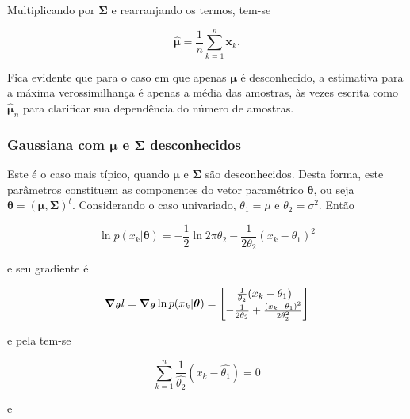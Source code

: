 \noindent Multiplicando por $\boldsymbol{\Sigma}$ e rearranjando os termos, tem-se

\begin{equation}
    \boldsymbol{\hat{\mu}} = \frac{1}{n} \sum_{k=1}^{n} \boldsymbol{x}_k.
    \label{eq:mu_optimum_case_1}
\end{equation}

Fica evidente que para o caso em que apenas $\boldsymbol{\mu}$ é desconhecido, a estimativa para a máxima verossimilhança é apenas a média das amostras, às vezes escrita como $\boldsymbol{\hat{\mu}}_n$ para clarificar sua dependência do número de amostras.

\subsubsection*{Gaussiana com $\boldsymbol{\mu}$ e $\boldsymbol{\Sigma}$ desconhecidos}

Este é o caso mais típico, quando $\boldsymbol{\mu}$ e $\boldsymbol{\Sigma}$ são desconhecidos. Desta forma, este parâmetros constituem as componentes do vetor paramétrico $\boldsymbol{\theta}$, ou seja $\boldsymbol{\theta} = (\boldsymbol{\mu}, \boldsymbol{\Sigma})^t$. Considerando o caso univariado, $\theta_1 = \mu$ e $\theta_2 = \sigma^2$. Então

\begin{equation}
    \ln p(x_k|\boldsymbol{\theta}) = -\frac{1}{2} \ln 2\pi\theta_2 - \frac{1}{2\theta_2}(x_k - \theta_1)^2
    \label{eq:log_likelihood_mu_sigma_univar}
\end{equation}

\noindent e seu gradiente é

\begin{equation}
    \boldsymbol{\nabla}_{\boldsymbol{\theta}} l = \boldsymbol{\nabla}_{\boldsymbol{\theta}} \ln p(x_k|\boldsymbol{\theta}) = \begin{bmatrix} \frac{1}{\theta_2}(x_k - \theta_1)\\ -\frac{1}{2\theta_2} + \frac{(x_k - \theta_1)^2}{2\theta_2^2} \end{bmatrix}
    \label{eq:grad_log_likelihood_mu_sigma_univar}
\end{equation}

\noindent e pela  tem-se

\begin{equation}
    \sum_{k=1}^n \frac{1}{\hat{\theta_2}}(x_k - \hat{\theta_1}) = 0
    \label{eq:grad_log_likelihood_mu_sigma_univar_theta_1}
\end{equation}

\noindent e

